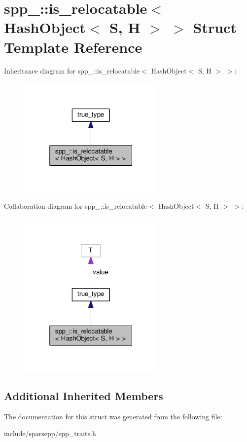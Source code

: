 \hypertarget{structspp___1_1is__relocatable_3_01_hash_object_3_01_s_00_01_h_01_4_01_4}{}\section{spp\+\_\+\+:\+:is\+\_\+relocatable$<$ Hash\+Object$<$ S, H $>$ $>$ Struct Template Reference}
\label{structspp___1_1is__relocatable_3_01_hash_object_3_01_s_00_01_h_01_4_01_4}


Inheritance diagram for spp\+\_\+\+:\+:is\+\_\+relocatable$<$ Hash\+Object$<$ S, H $>$ $>$\+:\nopagebreak
\begin{figure}[H]
\begin{center}
\leavevmode
\includegraphics[width=205pt]{structspp___1_1is__relocatable_3_01_hash_object_3_01_s_00_01_h_01_4_01_4__inherit__graph}
\end{center}
\end{figure}


Collaboration diagram for spp\+\_\+\+:\+:is\+\_\+relocatable$<$ Hash\+Object$<$ S, H $>$ $>$\+:\nopagebreak
\begin{figure}[H]
\begin{center}
\leavevmode
\includegraphics[width=205pt]{structspp___1_1is__relocatable_3_01_hash_object_3_01_s_00_01_h_01_4_01_4__coll__graph}
\end{center}
\end{figure}
\subsection*{Additional Inherited Members}


The documentation for this struct was generated from the following file\+:\begin{DoxyCompactItemize}
\item 
include/sparsepp/spp\+\_\+traits.\+h\end{DoxyCompactItemize}
